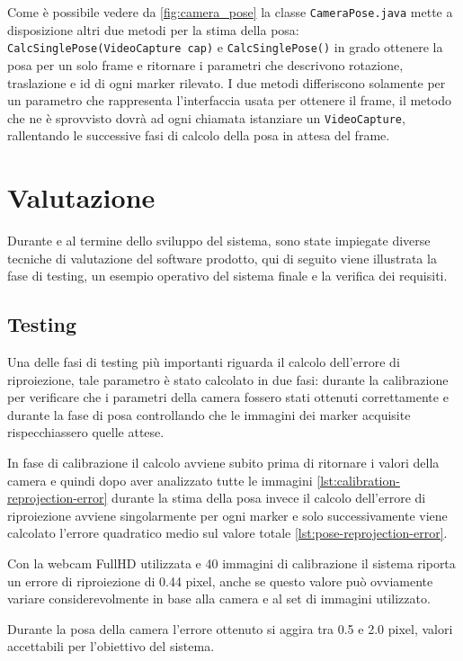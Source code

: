 \documentclass[12pt,a4paper,openright,twoside]{book}
\begin{document}
Come è possibile vedere da \ref{fig:camera_pose} la classe \texttt{CameraPose.java} mette a disposizione altri due metodi per la stima della posa: \texttt{CalcSinglePose(VideoCapture cap)} e \texttt{CalcSinglePose()} in grado ottenere la posa per un solo frame e ritornare i parametri che descrivono rotazione, traslazione e id di ogni marker rilevato.
I due metodi differiscono solamente per un parametro che rappresenta l'interfaccia usata per ottenere il frame, il metodo che ne è sprovvisto dovrà ad ogni chiamata istanziare un \texttt{VideoCapture}, rallentando le successive fasi di calcolo della posa in attesa del frame.

\chapter{Valutazione}
Durante e al termine dello sviluppo del sistema, sono state impiegate diverse tecniche di valutazione del software prodotto, qui di seguito viene illustrata la fase di testing, un esempio operativo del sistema finale e la verifica dei requisiti.
\section{Testing} \label{sec:testing}
Una delle fasi di testing più importanti riguarda il calcolo dell'errore di riproiezione, tale parametro è stato calcolato in due fasi: durante la calibrazione per verificare che i parametri della camera fossero stati ottenuti correttamente e durante la fase di posa controllando che le immagini dei marker acquisite rispecchiassero quelle attese.

In fase di calibrazione il calcolo avviene subito prima di ritornare i valori della camera e quindi dopo aver analizzato tutte le immagini \cref{lst:calibration-reprojection-error}
durante la stima della posa invece il calcolo dell'errore di riproiezione avviene singolarmente per ogni marker e solo successivamente viene calcolato l'errore quadratico medio sul valore totale \cref{lst:pose-reprojection-error}.

Con la webcam FullHD utilizzata e 40 immagini di calibrazione il sistema riporta un errore di riproiezione di 0.44 pixel, anche se questo valore può ovviamente variare considerevolmente in base alla camera e al set di immagini utilizzato.

Durante la posa della camera l'errore ottenuto si aggira tra 0.5 e 2.0 pixel, valori accettabili per l'obiettivo del sistema.


\end{document}
